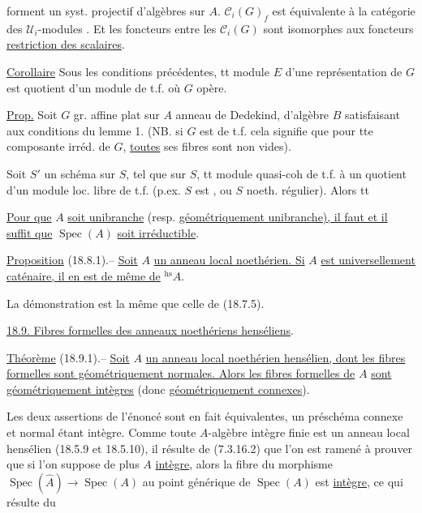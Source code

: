 forment un syst. projectif  d'algèbres sur $A$.
$\mathcal C_i(G)_f$ est équivalente  à la catégorie des $\mathcal U_i$-modules . Et les foncteurs  entre les $\mathcal C_i(G)$ sont isomorphes aux  foncteurs \uline{restriction des scalaires}.

\uline{Corollaire} Sous les conditions précédentes, tt module  $E$ d'une représentation de $G$ est quotient d'un module  de t.f. où $G$ opère.

\uline{Prop.} Soit $G$ gr. affine plat sur $A$ anneau de Dedekind, d'algèbre $B$ satisfaisant aux conditions du lemme 1. (NB. si $G$ est de t.f. cela signifie que pour tte composante irréd. de $G$, \uline{toutes} ses fibres sont non vides).

Soit  $S'$ un schéma sur $S$, tel que sur $S$, tt module quasi-coh de t.f.   à un quotient d'un module loc. libre de t.f.  (p.ex. $S$ est  , ou $S$ noeth. régulier). Alors tt


\uline{Pour que} $A$ \uline{soit unibranche} (resp. \uline{géométriquement unibranche), il faut et il suffit que} $\operatorname{Spec}(A)$ \uline{soit irréductible}.

\uline{Proposition} (18.8.1).-- \uline{Soit} $A$ \uline{un anneau local noethérien. Si} $A$ \uline{est universellement caténaire, il en est de même de} ${}^{\mathrm{hs}}A$.

La démonstration est la même que celle de (18.7.5).

\uline{18.9. Fibres formelles des anneaux noethériens henséliens}.

\uline{Théorème} (18.9.1).-- \uline{Soit} $A$ \uline{un anneau local noethérien hensélien, dont les fibres formelles sont géométriquement normales. Alors les fibres formelles de} $A$ \uline{sont géométriquement intègres} (donc \uline{géométriquement connexes}).

Les deux assertions de l'énoncé sont en fait équivalentes, un préschéma  connexe et normal étant intègre. Comme toute $A$-algèbre intègre finie est un anneau local hensélien (18.5.9 et 18.5.10), il résulte de (7.3.16.2) que l'on est ramené à prouver que si l'on suppose de plus $A$ \uline{intègre}, alors la fibre du morphisme $\operatorname{Spec}(\hat A)\to\operatorname{Spec}(A)$ au point générique de $\operatorname{Spec}(A)$ est \uline{intègre}, ce qui résulte du

